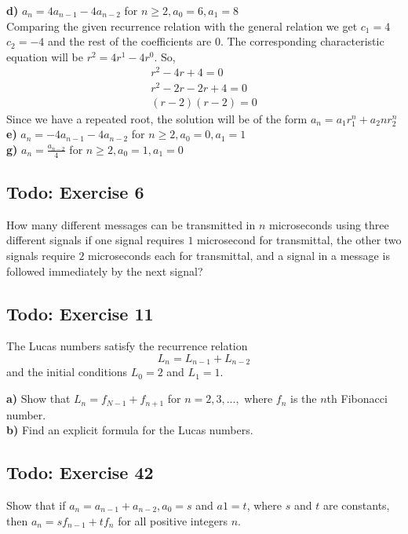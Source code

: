 \documentclass[12pt]{article}
\begin{document}
    \textbf{d)} $ a_n=4a_{n-1} - 4a_{n-2} $ for $ n \geq 2, a_0=6, a_1=8 $\\
    Comparing the given recurrence relation with the general relation we get $c_1=4$ $c_2=-4$ and the rest of the coefficients are 0.
    The corresponding characteristic equation will be $r^2=4r^1-4r^0$. So,
    \begin{equation}
        \begin{split}
            r^2-4r+4=0\\
            r^2-2r-2r+4=0\\
            (r-2)(r-2)=0
        \end{split}
    \end{equation}
    Since we have a repeated root, the solution will be of the form $a_n=a_1r_1^n+a_2nr_2^n$
    \textbf{e)} $ a_n=-4a_{n-1} - 4a_{n-2} $ for $ n \geq 2, a_0=0, a_1=1 $\\
    \textbf{g)} $ a_n=\frac{a_{n-2}}{4} $ for $ n \geq 2, a_0=1, a_1=0 $
    \subsection{Todo: Exercise 6}
    How many different messages can be transmitted in $n$ microseconds using three different signals if one signal requires $1$ microsecond for transmittal, the other two signals require $2$ microseconds each for transmittal, and a signal in a message is followed immediately by the next signal?

    \subsection{Todo: Exercise 11}
    The Lucas numbers satisfy the recurrence relation
    \begin{equation}
        L_n=L_{n-1}+L_{n-2}
    \end{equation}
    and the initial conditions $L_0 = 2$ and $L_1=1$.

    \textbf{a)} Show that $L_n = f_{N-1}+f_{n+1}$ for $n=2,3,...,$ where $f_n$ is the $n$th Fibonacci number.\\
    \textbf{b)} Find an explicit formula for the Lucas numbers.

    \subsection{Todo: Exercise 42}
    Show that if $a_n =a_{n-1} + a_{n-2}, a_0=s$ and $a1 =t$, where $s$ and $t$ are constants, then $a_n = sf_{n-1} + tf_n$ for all positive integers $n$.
\end{document}
